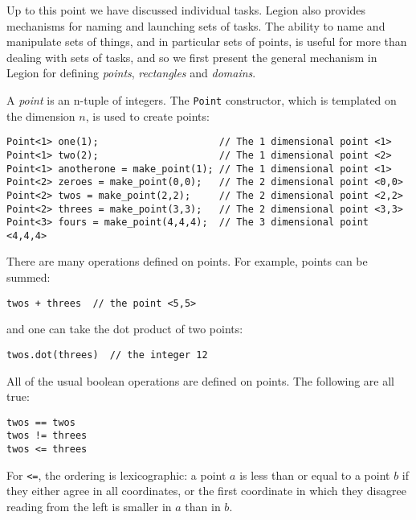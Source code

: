 \documentclass[11pt]{book}
\begin{document}
Up to this point we have discussed individual tasks.  Legion also provides mechanisms for
naming and launching sets of tasks.  The ability to name and manipulate sets of things, and 
in particular sets of points, is useful for
more than dealing with sets of tasks, and so we first present the general mechanism in
Legion for defining {\em points}, {\em rectangles} and {\em domains}.

A {\em point} is an n-tuple of integers.  The {\tt Point} constructor, which is templated on the
dimension $n$,  is used to create points:
\begin{verbatim}
Point<1> one(1);                     // The 1 dimensional point <1>
Point<1> two(2);                     // The 1 dimensional point <2>
Point<1> anotherone = make_point(1); // The 1 dimensional point <1>
Point<2> zeroes = make_point(0,0);   // The 2 dimensional point <0,0>
Point<2> twos = make_point(2,2);     // The 2 dimensional point <2,2>
Point<2> threes = make_point(3,3);   // The 2 dimensional point <3,3>
Point<3> fours = make_point(4,4,4);  // The 3 dimensional point <4,4,4>
\end{verbatim}

There are many operations defined on points.  For example, points can be summed:
\begin{verbatim}
twos + threes  // the point <5,5>
\end{verbatim}
and one can take the dot product of two points:             
\begin{verbatim}
twos.dot(threes)  // the integer 12
\end{verbatim}
All of the usual boolean operations are defined on points.  The following are all true:
\begin{verbatim}
twos == twos   
twos != threes 
twos <= threes 
\end{verbatim}
For \verb+<=+, the ordering is lexicographic: a point $a$ is less than or equal to a point $b$ if they either agree
in all coordinates, or the first coordinate in which they disagree reading from the left is smaller in $a$ than in $b$.
\end{document}

